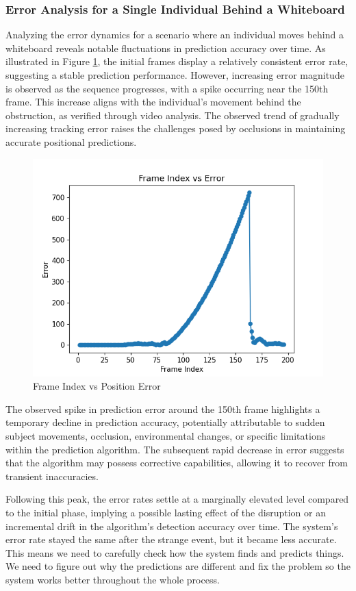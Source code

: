 \documentclass{article}
\begin{document}
\subsubsection{Error Analysis for a Single Individual Behind a Whiteboard}

Analyzing the error dynamics for a scenario where an individual moves behind a whiteboard reveals notable fluctuations in prediction accuracy over time. As illustrated in Figure \ref{fig:error one human}, the initial frames display a relatively consistent error rate, suggesting a stable prediction performance. However, increasing error magnitude is observed as the sequence progresses, with a spike occurring near the 150th frame. This increase aligns with the individual's movement behind the obstruction, as verified through video analysis. The observed trend of gradually increasing tracking error raises the challenges posed by occlusions in maintaining accurate positional predictions.

\begin{figure}[H]
\centering
\includegraphics[width=0.5\linewidth]{plot_onepeople.png}
\caption{Frame Index vs Position Error}
\label{fig:error one human}
\end{figure}

The observed spike in prediction error around the 150th frame highlights a temporary decline in prediction accuracy, potentially attributable to sudden subject movements, occlusion, environmental changes, or specific limitations within the prediction algorithm. The subsequent rapid decrease in error suggests that the algorithm may possess corrective capabilities, allowing it to recover from transient inaccuracies.

Following this peak, the error rates settle at a marginally elevated level compared to the initial phase, implying a possible lasting effect of the disruption or an incremental drift in the algorithm's detection accuracy over time. The system's error rate stayed the same after the strange event, but it became less accurate. This means we need to carefully check how the system finds and predicts things. We need to figure out why the predictions are different and fix the problem so the system works better throughout the whole process.
\end{document}
